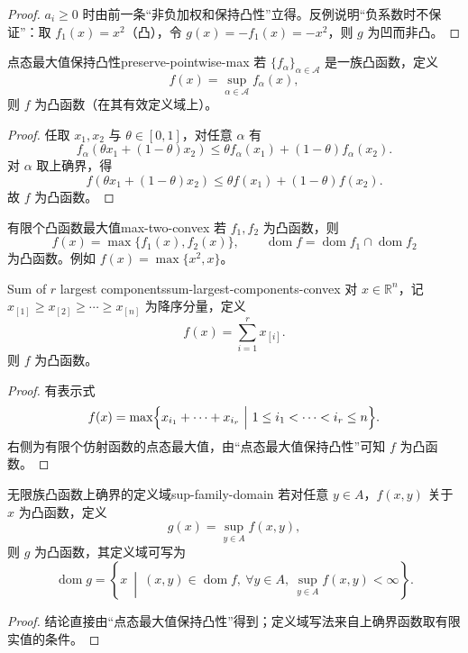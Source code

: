 \documentclass[11pt,a4paper]{article}
\begin{document}
\begin{proof}
$a_i\ge0$ 时由前一条“非负加权和保持凸性”立得。反例说明“负系数时不保证”：取
$f_1(x)=x^2$（凸），令 $g(x)=-f_1(x)=-x^2$，则 $g$ 为凹而非凸。
\end{proof}

\begin{theorem}{点态最大值保持凸性}{preserve-pointwise-max}
若 $\{f_\alpha\}_{\alpha\in\mathcal{A}}$ 是一族凸函数，定义
\[
f(x)=\sup_{\alpha\in\mathcal{A}} f_\alpha(x),
\]
则 $f$ 为凸函数（在其有效定义域上）。
\end{theorem}

\begin{proof}
任取 $x_1,x_2$ 与 $\theta\in[0,1]$，对任意 $\alpha$ 有
\[
f_\alpha(\theta x_1+(1-\theta)x_2)
\le
\theta f_\alpha(x_1)+(1-\theta)f_\alpha(x_2).
\]
对 $\alpha$ 取上确界，得
\[
f(\theta x_1+(1-\theta)x_2)
\le
\theta f(x_1)+(1-\theta)f(x_2).
\]
故 $f$ 为凸函数。
\end{proof}

\begin{example}{有限个凸函数最大值}{max-two-convex}
若 $f_1,f_2$ 为凸函数，则
\[
f(x)=\max\{f_1(x),f_2(x)\},\qquad
\operatorname{dom}f=\operatorname{dom}f_1\cap\operatorname{dom}f_2
\]
为凸函数。例如 $f(x)=\max\{x^2,x\}$。
\end{example}

\begin{example}{Sum of $r$ largest components}{sum-largest-components-convex}
对 $x\in\mathbb{R}^n$，记 $x_{[1]}\ge x_{[2]}\ge\cdots\ge x_{[n]}$ 为降序分量，定义
\[
f(x)=\sum_{i=1}^r x_{[i]}.
\]
则 $f$ 为凸函数。
\end{example}

\begin{proof}
有表示式
\[
f(x)=\max\Bigl\{x_{i_1}+\cdots+x_{i_r}\ \Big|\ 1\le i_1<\cdots<i_r\le n\Bigr\}.
\]
右侧为有限个仿射函数的点态最大值，由“点态最大值保持凸性”可知 $f$ 为凸函数。
\end{proof}

\begin{theorem}{无限族凸函数上确界的定义域}{sup-family-domain}
若对任意 $y\in A$，$f(x,y)$ 关于 $x$ 为凸函数，定义
\[
g(x)=\sup_{y\in A} f(x,y),
\]
则 $g$ 为凸函数，其定义域可写为
\[
\operatorname{dom}g=
\left\{
x\ \middle|\
(x,y)\in\operatorname{dom}f,\ \forall y\in A,\
\sup_{y\in A}f(x,y)<\infty
\right\}.
\]
\end{theorem}

\begin{proof}
结论直接由“点态最大值保持凸性”得到；定义域写法来自上确界函数取有限实值的条件。
\end{proof}
\end{document}
